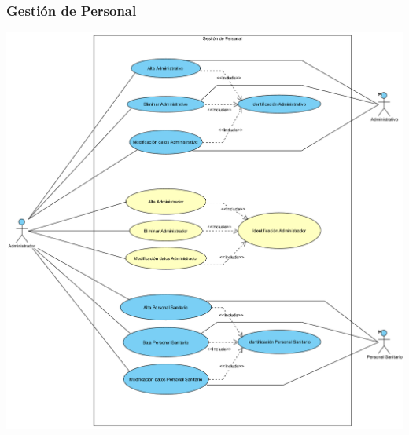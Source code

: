 \documentclass[12pt, spanish]{article}
\begin{document}
\subsubsection*{Gestión de Personal}
\begin{centering}\includegraphics[scale = 0.50]{diagramas_cu/1.png}\\[1.0 cm]\end{centering}
\end{document}
